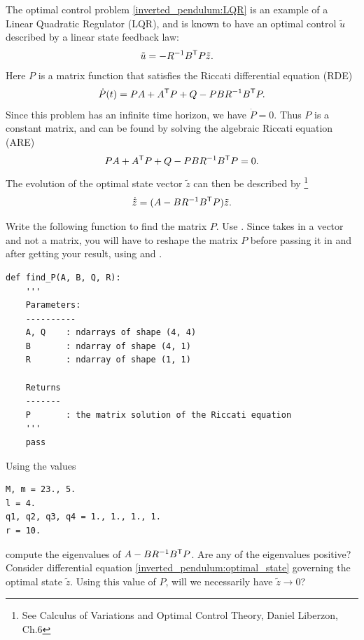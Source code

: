 The optimal control problem \eqref{inverted_pendulum:LQR} is an example of a Linear Quadratic Regulator (LQR), and is known to have an optimal control $\tilde{u}$ described by a linear state feedback law:
\begin{align*}
\tilde{u} &= -R^{-1}B^{\mathsf T} P\tilde{z}.
\end{align*}
Here $P$ is a matrix function that satisfies the Riccati differential equation (RDE)
\[
\dot{P}(t) = PA + A^{\mathsf T} P + Q - PBR^{-1}B^{\mathsf T}  P.
\]
Since this problem has an infinite time horizon, we have $\dot{P} = 0$. Thus $P$ is a constant matrix, and can be found by solving the algebraic Riccati equation (ARE)
\begin{align}
 PA + A^{\mathsf T} P + Q - PBR^{-1}B^{\mathsf T}  P = 0.  \label{inverted_pendulum:ARE}
\end{align}
The evolution of the optimal state vector $\tilde{z}$ can then be described by \footnote{See Calculus of Variations and Optimal Control Theory, Daniel Liberzon, Ch.6}
\begin{align}
\dot{\tilde{z}} = (A - BR^{-1}B^{\mathsf T} P)\tilde{z}. \label{inverted_pendulum:optimal_state}
\end{align}

\begin{problem}
Write the following function to find the matrix $P$.
Use .
Since  takes in a vector and not a matrix, you will have to reshape the matrix $P$ before passing it in and after getting your result, using  and .
\begin{lstlisting}
def find_P(A, B, Q, R):
	'''
	Parameters:
	----------
	A, Q 	: ndarrays of shape (4, 4)
	B		: ndarray of shape (4, 1)
	R		: ndarray of shape (1, 1)

	Returns
	-------
	P		: the matrix solution of the Riccati equation
	'''
	pass

\end{lstlisting}
Using the values
\begin{lstlisting}
M, m = 23., 5.
l = 4.
q1, q2, q3, q4 = 1., 1., 1., 1.
r = 10.
\end{lstlisting}
compute the eigenvalues of $A - BR^{-1}B^{\mathsf T} P$.
Are any of the eigenvalues positive?
Consider differential equation \eqref{inverted_pendulum:optimal_state} governing the optimal state $\tilde{z}$.
Using this value of $P$, will we necessarily have $\tilde{z} \to 0$?
\end{problem}


